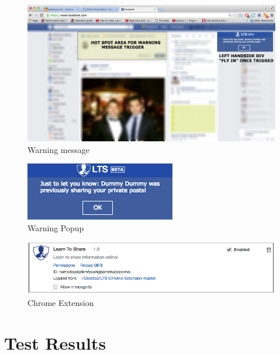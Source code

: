 \documentclass[a4paper,11pt]{article}
\begin{document}
\begin{figure}[H]
	\centering
	\includegraphics[scale=0.32]{APpendix/WarnMessage}
	\caption{Warning message}
\end{figure}
\vspace{1cm}
\begin{figure}[H]
	\centering
	\includegraphics[scale=0.72]{APpendix/warnpopup}
	\caption{Warning Popup}
\end{figure}
\vspace{1cm}

\begin{figure}[H]
	\centering
	\includegraphics[scale=0.725]{APpendix/lts2}
	\caption{Chrome Extension}
\end{figure}

\section{Test Results}
\end{document}
